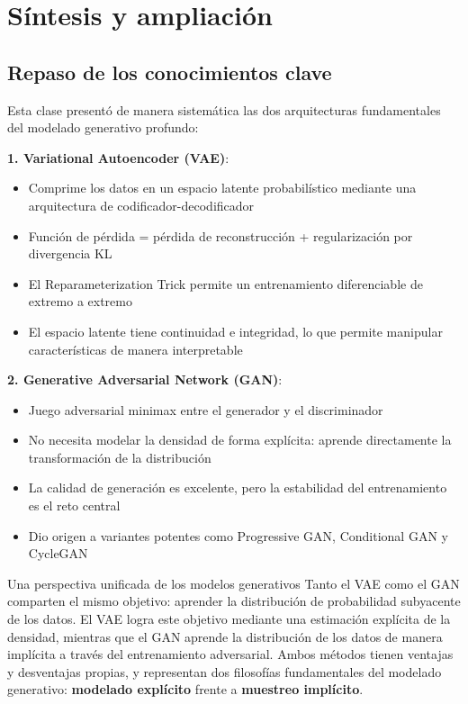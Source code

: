\section{Síntesis y ampliación}

\subsection{Repaso de los conocimientos clave}

Esta clase presentó de manera sistemática las dos arquitecturas fundamentales del modelado generativo profundo:

\textbf{1. Variational Autoencoder (VAE)}:
\begin{itemize}
    \item Comprime los datos en un espacio latente probabilístico mediante una arquitectura de codificador-decodificador
    \item Función de pérdida = pérdida de reconstrucción + regularización por divergencia KL
    \item El Reparameterization Trick permite un entrenamiento diferenciable de extremo a extremo
    \item El espacio latente tiene continuidad e integridad, lo que permite manipular características de manera interpretable
\end{itemize}

\textbf{2. Generative Adversarial Network (GAN)}:
\begin{itemize}
    \item Juego adversarial minimax entre el generador y el discriminador
    \item No necesita modelar la densidad de forma explícita: aprende directamente la transformación de la distribución
    \item La calidad de generación es excelente, pero la estabilidad del entrenamiento es el reto central
    \item Dio origen a variantes potentes como Progressive GAN, Conditional GAN y CycleGAN
\end{itemize}

\begin{importantbox}{Una perspectiva unificada de los modelos generativos}
Tanto el VAE como el GAN comparten el mismo objetivo: aprender la distribución de probabilidad subyacente de los datos. El VAE logra este objetivo mediante una estimación explícita de la densidad, mientras que el GAN aprende la distribución de los datos de manera implícita a través del entrenamiento adversarial. Ambos métodos tienen ventajas y desventajas propias, y representan dos filosofías fundamentales del modelado generativo: \textbf{modelado explícito} frente a \textbf{muestreo implícito}.
\end{importantbox}

